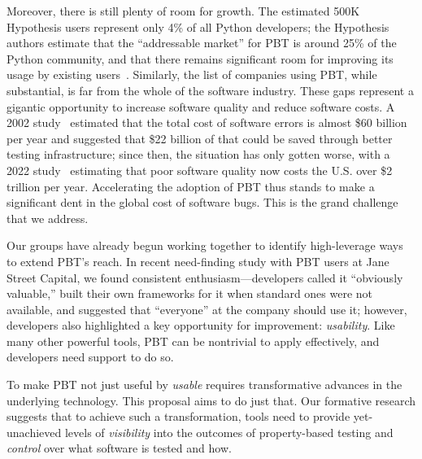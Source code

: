 Moreover, there is still plenty of room
for growth.
The estimated  500K
Hypothesis users represent only 4\% of all Python developers; the Hypothesis
authors estimate that the ``addressable market'' for PBT is around
25\% of the Python
community, and that there remains significant room for
improving its usage by existing users~\cite{ZacPersonalCommunication,noauthor_python_nodate}.
Similarly, the list of
companies using PBT, while substantial, is far from the whole of the software
industry.
These gaps represent a gigantic opportunity to increase software quality
and reduce software costs.
A 2002 study~\cite{2002economic} estimated that the total cost of software errors is almost
\$60 billion per year and suggested that \$22 billion of that could be
saved through
better testing infrastructure; since then, the situation has only gotten worse, with a 2022
study~\cite{krasner2022cost} estimating that poor software quality now
costs the U.S.{} over \$2 trillion per
year. Accelerating the adoption of PBT thus stands to make a
significant dent
in the global cost of software bugs.  This is the grand challenge that
we address.

Our groups have already begun working together to identify
high-leverage ways to extend PBT's reach.
In recent need-finding study with PBT users at Jane Street
Capital, we found consistent enthusiasm---developers called it
``obviously valuable,'' built their own
frameworks for it when standard ones were not available, and suggested that ``everyone''
at the company should use it; however, developers
also highlighted a key opportunity for improvement: {\em usability}.
%
Like
many other powerful tools, PBT can be nontrivial to apply effectively, and developers
need support to do so.

 To make PBT not just useful by
\emph{usable} requires transformative advances in the underlying technology.
This proposal aims to do just that. Our formative research suggests that to achieve
such a transformation, tools need to provide yet-unachieved levels of
\emph{visibility} into the outcomes of property-based testing and \emph{control}
over what software is tested and how.

